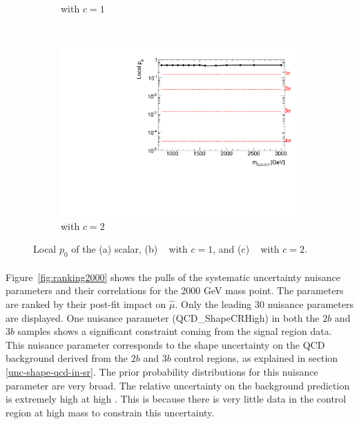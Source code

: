 \begin{figure}[htb!]
\begin{subfigure}[b]{0.35\textwidth}
        \caption{\Grav with $c=1$}
        \label{fig:localp0-g1}
    \end{subfigure}
    \\
    \hspace{-2.5cm}
    \begin{subfigure}[b]{0.35\textwidth}
        \includegraphics[width=\textwidth,angle=-90]{figures/boosted/results/p0_g20_allmasses_boosted.pdf}
        \caption{\Grav with $c=2$}
        \label{fig:localp0-g2}
    \end{subfigure}
  \caption{Local $p_0$ of the (a) scalar, (b) \Grav~ with $c=1$,  and (c) \Grav~ with $c=2$.}
  \label{fig:localp0}
\end{figure}

\paragraph{}
Figure~\ref{fig:ranking2000} shows the pulls of the systematic uncertainty nuisance parameters and their correlations for the 2000 GeV mass point. 
The parameters are ranked by their post-fit impact on $\hat{\mu}$. 
Only the leading 30 nuisance parameters are displayed.
One nuisance parameter (QCD\_ShapeCRHigh) in both the $2b$ and $3b$ samples shows a significant constraint coming from the signal region data. 
This nuisance parameter corresponds to the shape uncertainty on the QCD background derived from the $2b$ and $3b$ control regions, as explained in section \ref{unc-shape-qcd-in-sr}. 
The prior probability distributions for this nuisance parameter are very broad.
The relative uncertainty on the background prediction is extremely high at high \mtwoJ. 
This is because there is very little data in the control region at high mass to constrain this uncertainty.

